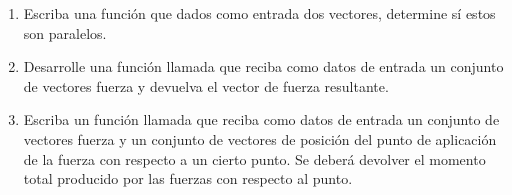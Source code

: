 \begin{enumerate}
\item Escriba una función que dados como entrada dos vectores, determine sí estos son 
paralelos.

\item Desarrolle una función llamada  que reciba como datos de entrada 
un conjunto de vectores fuerza y devuelva el vector de fuerza resultante.

\item Escriba un función llamada  que reciba como datos de entrada un conjunto de 
vectores fuerza y un conjunto de vectores de posición del punto de aplicación de la fuerza con respecto 
a un cierto punto. Se deberá devolver el momento total producido por las fuerzas con respecto al punto.

\end{enumerate}